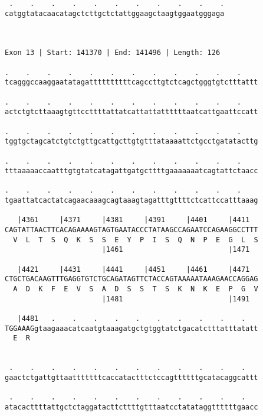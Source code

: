 \documentclass{article}
\begin{document}
\begin{Verbatim}
 .    .    .    .    .    .    .    .    .    .    .
catggtatacaacatagctcttgctctattggaagctaagtggaatgggaga
                                                    
                                                    
 
Exon 13 | Start: 141370 | End: 141496 | Length: 126
 
.    .    .    .    .    .    .    .    .    .    .    .    
tcagggccaaggaatatagattttttttttcagccttgtctcagctgggtgtctttattt
                                                            
.    .    .    .    .    .    .    .    .    .    .    .    
actctgtcttaaagtgttccttttattatcattattattttttaatcattgaattccatt
                                                            
.    .    .    .    .    .    .    .    .    .    .    .    
tggtgctagcatctgtctgttgcattgcttgtgtttataaaattctgcctgatatacttg
                                                            
.    .    .    .    .    .    .    .    .    .    .    .    
tttaaaaaccaatttgtgtatcatagattgatgcttttgaaaaaaatcagtattctaacc
                                                            
.    .    .    .    .    .    .    .    .    .    .    .    
tgaattatcactatcagaacaaagcagtaaagtagatttgttttctcattccatttaaag
                                                            
   |4361     |4371     |4381     |4391     |4401     |4411  
CAGTATTAACTTCACAGAAAAGTAGTGAATACCCTATAAGCCAGAATCCAGAAGGCCTTT
  V  L  T  S  Q  K  S  S  E  Y  P  I  S  Q  N  P  E  G  L  S
                       |1461                         |1471  
  
   |4421     |4431     |4441     |4451     |4461     |4471  
CTGCTGACAAGTTTGAGGTGTCTGCAGATAGTTCTACCAGTAAAAATAAAGAACCAGGAG
  A  D  K  F  E  V  S  A  D  S  S  T  S  K  N  K  E  P  G  V
                       |1481                         |1491  
  
   |4481   .    .    .    .    .    .    .    .    .    .   
TGGAAAGgtaagaaacatcaatgtaaagatgctgtggtatctgacatctttatttatatt
  E  R                                                      
                                                            
  
 .    .    .    .    .    .    .    .    .    .    .    .   
gaactctgattgttaatttttttcaccatactttctccagttttttgcatacaggcattt
                                                            
 .    .    .    .    .    .    .    .    .    .    .    .   
atacacttttattgctctaggatacttcttttgtttaatcctatataggttttttgaacc
                                                            

\end{Verbatim}
\end{document}
